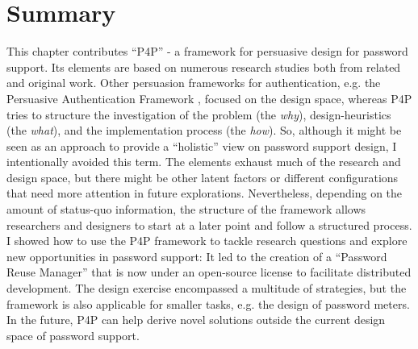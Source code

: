 \section{Summary}
This chapter contributes ``P4P'' - a framework for persuasive design for password support. Its elements are based on numerous research studies both from related and original work. Other persuasion frameworks for authentication, e.g. the Persuasive Authentication Framework \cite{Forget2007PersuasionEducationSecurity}, focused on the design space, whereas P4P tries to structure the investigation of the problem (the \textit{why}), design-heuristics (the \textit{what}), and the implementation process (the \textit{how}). So, although it might be seen as an approach to provide a ``holistic'' view on password support design, I intentionally avoided this term. The elements exhaust much of the research and design space, but there might be other latent factors or different configurations that need more attention in future explorations. Nevertheless, depending on the amount of status-quo information, the structure of the framework allows researchers and designers to start at a later point and follow a structured process. I showed how to use the P4P framework to tackle research questions and explore new opportunities in password support: It led to the creation of a ``Password Reuse Manager'' that is now under an open-source license to facilitate distributed development. The design exercise encompassed a multitude of strategies, but the framework is also applicable for smaller tasks, e.g. the design of password meters. In the future, P4P can help derive novel solutions outside the current design space of password support. 

\vspace*{1.5cm}
\noindent
{}

